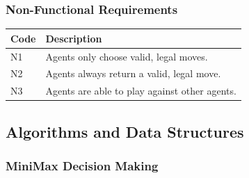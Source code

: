 \documentclass[12pt,a4paper]{article}
\begin{document}
    \subsubsection*{Non-Functional Requirements}
      
    \begin{center}
        \begin{tabular*}{1\textwidth}{| l | p{144.5mm} |}
        \hline
        Code & Description \\ \hline
        N1 & Agents only choose valid, legal moves. \\ \hline
        N2 & Agents always return a valid, legal move.\\ \hline
        N3 & Agents are able to play against other agents. \\ \hline
        \end{tabular*}
    \end{center}



\subsection*{Algorithms and Data Structures}

\subsubsection{MiniMax Decision Making}
\end{document}
